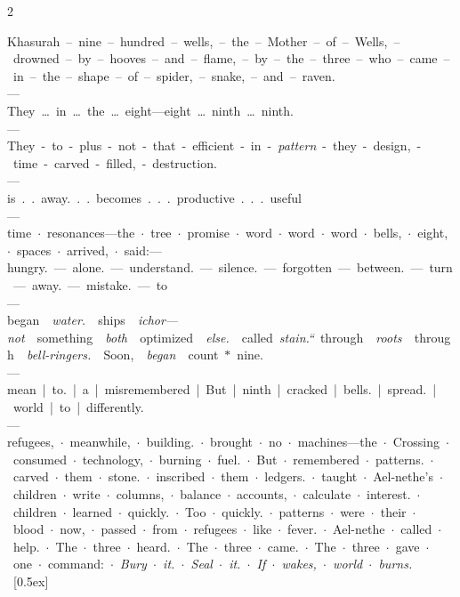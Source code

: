 \documentclass[11pt,letterpaper,twoside]{book}
\begin{document}
\begin{multicols}{2}
\ttfamily\small
\setlength{\parindent}{0pt}
\setlength{\parskip}{0.5ex}

\noindent
Khasurah~--~nine~--~hundred~--~wells,~--~the~--~Mother~--~of~--~Wells,~--~drowned~--~by~--~hooves~--~and~--~flame,~--~by~--~the~--~three~--~who~--~came~--~in~--~the~--~shape~--~of~--~spider,~--~snake,~--~and~--~raven.\\[0.5ex]
---\\
They~\dots~in~\dots~the~\dots~eight---eight~\dots~ninth~\dots~ninth.\\[0.5ex]
---\\
They~-~to~-~plus~-~not~-~that~-~efficient~-~in~-~\textit{pattern}~-~they~-~design,~-~time~-~carved~-~filled,~-~destruction.\\[0.5ex]
---\\
is~.~.~away.~.~.~becomes~.~.~.~productive~.~.~.~useful\\[0.5ex]
---\\
time~$\cdot$~resonances---the~$\cdot$~tree~$\cdot$~promise~$\cdot$~word~$\cdot$~word~$\cdot$~word~$\cdot$~bells,~$\cdot$~eight,~$\cdot$~spaces~$\cdot$~arrived,~$\cdot$~said:---\\
hungry.~---~alone.~---~understand.~---~silence.~---~forgotten~---~between.~---~turn~---~away.~---~mistake.~---~to\\[0.5ex]
---\\
began~\textit{~water.~}~ships~\textit{~ichor---not~}~something~\textit{~both~}~optimized~\textit{~else.~}~called~\textit{stain.``}~through~\textit{~roots~}~through~\textit{~bell-ringers.~}~Soon,~\textit{~began~}~count~$*$~nine.\\[0.5ex]
---\\
mean~|~to.~|~a~|~misremembered~|~But~|~ninth~|~cracked~|~bells.~|~spread.~|~world~|~to~|~differently.\\[0.5ex]
---\\
refugees,~\(\cdot\)~meanwhile,~\(\cdot\)~building.~\(\cdot\)~brought~\(\cdot\)~no~\(\cdot\)~machines---the~\(\cdot\)~Crossing~\(\cdot\)~consumed~\(\cdot\)~technology,~\(\cdot\)~burning~\(\cdot\)~fuel.~\(\cdot\)~But~\(\cdot\)~remembered~\(\cdot\)~patterns.~\(\cdot\)~carved~\(\cdot\)~them~\(\cdot\)~stone.~\(\cdot\)~inscribed~\(\cdot\)~them~\(\cdot\)~ledgers.~\(\cdot\)~taught~\(\cdot\)~Ael-nethe's~\(\cdot\)~children~\(\cdot\)~write~\(\cdot\)~columns,~\(\cdot\)~balance~\(\cdot\)~accounts,~\(\cdot\)~calculate~\(\cdot\)~interest.~\(\cdot\)~children~\(\cdot\)~learned~\(\cdot\)~quickly.~\(\cdot\)~Too~\(\cdot\)~quickly.~\(\cdot\)~patterns~\(\cdot\)~were~\(\cdot\)~their~\(\cdot\)~blood~\(\cdot\)~now,~\(\cdot\)~passed~\(\cdot\)~from~\(\cdot\)~refugees~\(\cdot\)~like~\(\cdot\)~fever.~\(\cdot\)~Ael-nethe~\(\cdot\)~called~\(\cdot\)~help.~\(\cdot\)~The~\(\cdot\)~three~\(\cdot\)~heard.~\(\cdot\)~The~\(\cdot\)~three~\(\cdot\)~came.~\(\cdot\)~The~\(\cdot\)~three~\(\cdot\)~gave~\(\cdot\)~one~\(\cdot\)~command:~\(\cdot\)~\textit{Bury~\(\cdot\)~it.~\(\cdot\)~Seal~\(\cdot\)~it.~\(\cdot\)~If~\(\cdot\)~wakes,~\(\cdot\)~world~\(\cdot\)~burns.}\\~[0.5ex]

\end{multicols}
\end{document}
